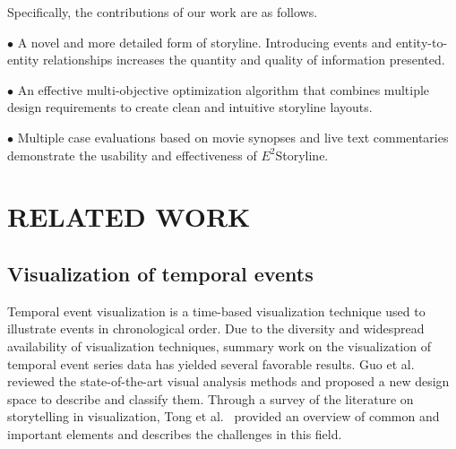 \documentclass[review,journal]{vgtc}         %
\begin{document}
Specifically, the contributions of our work are as follows.

$\bullet$ A novel and more detailed form of storyline. Introducing events and entity-to-entity relationships increases the quantity and quality of information presented.

$\bullet$ An effective multi-objective optimization algorithm that combines multiple design requirements to create clean and intuitive storyline layouts.

$\bullet$ Multiple case evaluations based on movie synopses and live text commentaries demonstrate the usability and effectiveness of $E^2$Storyline.

\section{RELATED WORK}
\subsection{Visualization of temporal events}
\noindent Temporal event visualization is a time-based visualization technique used to illustrate events in chronological order. Due to the diversity and widespread availability of visualization techniques, summary work on the visualization of temporal event series data has yielded several favorable results. Guo et al.~\cite{guo_survey_2021} reviewed the state-of-the-art visual analysis methods and proposed a new design space to describe and classify them. Through a survey of the literature on storytelling in visualization, Tong et al.~\cite{tong_storytelling_2018} provided an overview of common and important elements and describes the challenges in this field.
\end{document}
